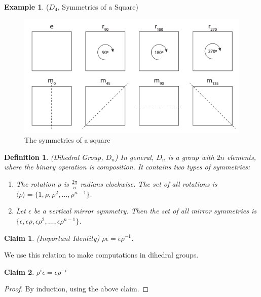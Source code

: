 \documentclass[12pt]{article}
\newtheorem{claim}{Claim}
\newtheorem{definition}{Definition}
\theoremstyle{definition}
\newtheorem{example}{Example}
\theoremstyle{definition}
\newcommand{\e}{\epsilon}
\begin{document}
\begin{example}($D_4$, Symmetries of a Square)
\begin{figure}[H]
	\begin{center}
		\includegraphics[scale=.75]{square-symmetries}
	\end{center}
	\caption{The symmetries of a square}
	\label{triangle_sym}
\end{figure}

\end{example}

\begin{definition}(Dihedral Group, $D_n$)
In general, $D_n$ is a group with $2n$ elements, where the binary operation is composition. It contains two types of symmetries:
\begin{enumerate}
	\item The rotation $\rho$ is $\frac{2\pi}{n}$ radians clockwise. The set of all rotations is $\langle \rho \rangle = \{1, \rho, \rho^2, \ldots, \rho^{n-1} \}$. 
	\item Let $\e$ be a vertical mirror symmetry. Then the set of all mirror symmetries is $\{\e, \e\rho, \e\rho^2, \ldots, \e \rho^{n-1} \}$. 
\end{enumerate}
\end{definition}


\begin{claim}(Important Identity)
$\rho \e = \e \rho^{-1}$. 
\end{claim}
We use this relation to make computations in dihedral groups. 


\begin{claim}
$\rho^i \e = \e \rho^{-i}$
\end{claim}
\begin{proof}
By induction, using the above claim. 
\end{proof}
\end{document}
